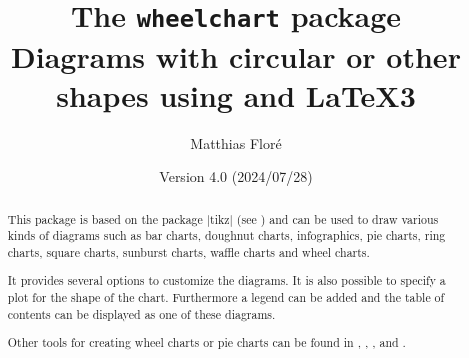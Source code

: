 \documentclass[a4paper,english,dvipsnames]{ltxdoc}
\title{The \texttt{wheelchart} package\\[12pt]\large Diagrams with circular or other shapes using \tikzname{} and \LaTeX3}
\author{Matthias Floré}
\date{Version 4.0 (2024/07/28)}%
\begin{document}
\iftotalpages%
\newsavebox{\fancyfootdefaultbox}%
\begin{lrbox}{\fancyfootdefaultbox}%
\end{lrbox}%
\fi%
\maketitle
\thispagestyle{fancy}
\begin{abstract}
\noindent This package is based on the package |tikz| (see \cite{TtTaPGFp}) and can be used to draw various kinds of diagrams such as bar charts, doughnut charts, infographics, pie charts, ring charts, square charts, sunburst charts, waffle charts and wheel charts.

\noindent It provides several options to customize the diagrams. It is also possible to specify a plot for the shape of the chart. Furthermore a legend can be added and the table of contents can be displayed as one of these diagrams.

\noindent Other tools for creating wheel charts or pie charts can be found in \cite{MpMP}, \cite{JhcIparowcltopotPGFm}, \cite{Tumfdb}, \cite{XdPCbupp} and \cite{RSVpaaMfp}.%
\end{abstract}
\end{document}
